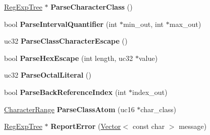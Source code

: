 \begin{DoxyCompactItemize}
\item 
\hypertarget{classv8_1_1internal_1_1_b_a_s_e___e_m_b_e_d_d_e_d_a1d87556e721200a155bb2d81ecec43ac}{}\hyperlink{classv8_1_1internal_1_1_reg_exp_tree}{Reg\+Exp\+Tree} $\ast$ {\bfseries Parse\+Character\+Class} ()\label{classv8_1_1internal_1_1_b_a_s_e___e_m_b_e_d_d_e_d_a1d87556e721200a155bb2d81ecec43ac}

\item 
\hypertarget{classv8_1_1internal_1_1_b_a_s_e___e_m_b_e_d_d_e_d_af9e53e14f3c16ca70a4bd64128e5b106}{}bool {\bfseries Parse\+Interval\+Quantifier} (int $\ast$min\+\_\+out, int $\ast$max\+\_\+out)\label{classv8_1_1internal_1_1_b_a_s_e___e_m_b_e_d_d_e_d_af9e53e14f3c16ca70a4bd64128e5b106}

\item 
\hypertarget{classv8_1_1internal_1_1_b_a_s_e___e_m_b_e_d_d_e_d_a6637316353f91d69a66fa359f1846a57}{}uc32 {\bfseries Parse\+Class\+Character\+Escape} ()\label{classv8_1_1internal_1_1_b_a_s_e___e_m_b_e_d_d_e_d_a6637316353f91d69a66fa359f1846a57}

\item 
\hypertarget{classv8_1_1internal_1_1_b_a_s_e___e_m_b_e_d_d_e_d_aeef963e0c33741d18f95cf1eb22c207a}{}bool {\bfseries Parse\+Hex\+Escape} (int length, uc32 $\ast$value)\label{classv8_1_1internal_1_1_b_a_s_e___e_m_b_e_d_d_e_d_aeef963e0c33741d18f95cf1eb22c207a}

\item 
\hypertarget{classv8_1_1internal_1_1_b_a_s_e___e_m_b_e_d_d_e_d_a63ccd6c56403922e00fb72a232345192}{}uc32 {\bfseries Parse\+Octal\+Literal} ()\label{classv8_1_1internal_1_1_b_a_s_e___e_m_b_e_d_d_e_d_a63ccd6c56403922e00fb72a232345192}

\item 
\hypertarget{classv8_1_1internal_1_1_b_a_s_e___e_m_b_e_d_d_e_d_af2948ef3c333ebbe5b77cc883e7ef58d}{}bool {\bfseries Parse\+Back\+Reference\+Index} (int $\ast$index\+\_\+out)\label{classv8_1_1internal_1_1_b_a_s_e___e_m_b_e_d_d_e_d_af2948ef3c333ebbe5b77cc883e7ef58d}

\item 
\hypertarget{classv8_1_1internal_1_1_b_a_s_e___e_m_b_e_d_d_e_d_ad7e3333d02046cf2fb8cad2a87536b5a}{}\hyperlink{classv8_1_1internal_1_1_character_range}{Character\+Range} {\bfseries Parse\+Class\+Atom} (uc16 $\ast$char\+\_\+class)\label{classv8_1_1internal_1_1_b_a_s_e___e_m_b_e_d_d_e_d_ad7e3333d02046cf2fb8cad2a87536b5a}

\item 
\hypertarget{classv8_1_1internal_1_1_b_a_s_e___e_m_b_e_d_d_e_d_af7ea948004311de7387e487e57e1250f}{}\hyperlink{classv8_1_1internal_1_1_reg_exp_tree}{Reg\+Exp\+Tree} $\ast$ {\bfseries Report\+Error} (\hyperlink{classv8_1_1internal_1_1_vector}{Vector}$<$ const char $>$ message)\label{classv8_1_1internal_1_1_b_a_s_e___e_m_b_e_d_d_e_d_af7ea948004311de7387e487e57e1250f}


\end{DoxyCompactItemize}
